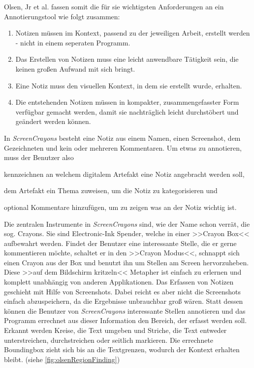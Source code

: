 \medskip Olsen, Jr et al. fassen somit die für sie wichtigsten Anforderungen an ein Annotierungstool wie folgt zusammen:

\begin{enumerate}
	\item Notizen müssen im Kontext, passend zu der jeweiligen Arbeit, erstellt werden - nicht in einem seperaten Programm.
	\item Das Erstellen von Notizen muss eine leicht anwendbare Tätigkeit sein, die keinen großen Aufwand mit sich bringt.
	\item Eine Notiz muss den visuellen Kontext, in dem sie erstellt wurde, erhalten.
	\item Die entstehenden Notizen müssen in kompakter, zusammengefasster Form verfügbar gemacht werden, damit sie nachträglich leicht durchstöbert und geändert werden können.
\end{enumerate}

In \emph{ScreenCrayons} besteht eine Notiz aus einem Namen, einen Screenshot, dem Gezeichneten und kein oder mehreren Kommentaren. Um etwas zu annotieren, muss der Benutzer also 
\begin{inparaenum}[\itshape 1\upshape)]
\item kennzeichnen an welchem digitalem Artefakt eine Notiz angebracht werden soll,
\item dem Artefakt ein Thema zuweisen, um die Notiz zu kategorisieren und
\item optional Kommentare hinzufügen, um zu zeigen was an der Notiz wichtig ist.
\end{inparaenum}

\medskip Die zentralen Instrumente in \emph{ScreenCrayons} sind, wie der Name schon verrät, die sog. Crayons. Sie sind Electronic-Ink Spender, welche in einer >>Crayon Box<< aufbewahrt werden. Findet der Benutzer eine interessante Stelle, die er gerne kommentieren möchte, schaltet er in den >>Crayon Modus<<, schnappt sich einen Crayon aus der Box und benutzt ihn um Stellen am Screen hervorzuheben. Diese >>auf dem Bildschirm kritzeln<< Metapher ist einfach zu erlernen und komplett unabhängig von anderen Applikationen.
Das Erfassen von Notizen geschieht mit Hilfe von Screenshots. Dabei reicht es aber nicht die Screenshots einfach abzuspeichern, da die Ergebnisse unbrauchbar groß wären. Statt dessen können die Benutzer von \emph{ScreenCrayons} interessante Stellen annotieren und das Programm errechnet aus dieser Information den Bereich, der erfasst werden soll. Erkannt werden Kreise, die Text umgeben und Striche, die Text entweder unterstreichen, durchstreichen oder seitlich markieren. Die errechnete Boundingbox zieht sich bis an die Textgrenzen, wodurch der Kontext erhalten bleibt. (siehe \autoref{fig:olsenRegionFinding}) 

